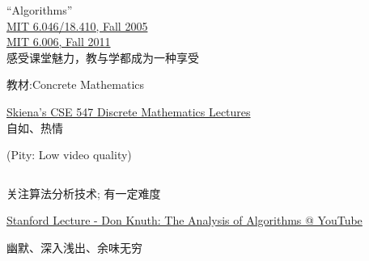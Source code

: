 \begin{frame}{}
  \begin{columns}
  \end{columns}

  \vspace{0.50cm}
  \begin{center}
    ``Algorithms''\\[4pt]
    \href{http://open.163.com/special/opencourse/algorithms.html}{MIT 6.046/18.410, Fall 2005}\\[3pt]
    \href{https://ocw.mit.edu/courses/electrical-engineering-and-computer-science/6-006-introduction-to-algorithms-fall-2011/lecture-videos/}{MIT 6.006, Fall 2011}\\[10pt]
    
    感受课堂魅力，教与学都成为一种享受
  \end{center}
\end{frame}

\begin{frame}{}

  \begin{center}
    教材:Concrete Mathematics

    \href{http://www3.cs.stonybrook.edu/~algorith/math-video/}{Skiena's CSE 547 Discrete Mathematics Lectures} \\[8pt]

    自如、热情

    {\small (Pity: Low video quality)}
  \end{center}
\end{frame}

\begin{frame}{}
  \begin{columns}
  \end{columns}

  \vspace{0.50cm}
  \begin{center}
    关注算法分析技术; 有一定难度
  \end{center}
\end{frame}

\begin{frame}{}

  \centerline{\href{https://youtu.be/jmcSzzN1gkc}{Stanford Lecture - Don Knuth: The Analysis of Algorithms @ YouTube}}

  \vspace{0.30cm}
  \centerline{幽默、深入浅出、余味无穷}
\end{frame}

